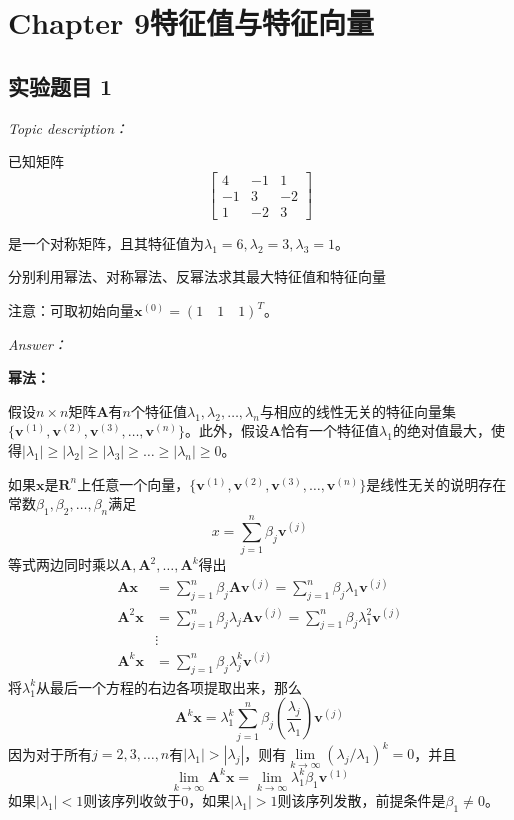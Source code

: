 \documentclass[12pt]{ctexart}
\begin{document}
\newpage
	\section{Chapter 9\quad 特征值与特征向量}
	\label{sec:9}
	
	\subsection{实验题目 1}
	\textit{Topic description：}
	
	已知矩阵
	\[
	\begin{bmatrix}
	4&-1&1 \\
	-1&3&-2 \\
	1&-2&3
	\end{bmatrix}
	\]
	
	是一个对称矩阵，且其特征值为$\lambda_1=6,\lambda_2=3,\lambda_3=1$。
	
	分别利用幂法、对称幂法、反幂法求其最大特征值和特征向量
	
	注意：可取初始向量$\textbf{x}^{(0)}=(1\quad1\quad1)^T$。
	
	\textit{Answer：}
	
	\textbf{幂法：}
	
	假设$n\times n$矩阵$\mathbf{A}$有$n$个特征值$\lambda_1,\lambda_2,\dots,\lambda_n$与相应的线性无关的特征向量集$\{\mathbf{v}^{(1)},\mathbf{v}^{(2)},\mathbf{v}^{(3)},\dots,\mathbf{v}^{(n)}\}$。此外，假设$\mathbf{A}$恰有一个特征值$\lambda_1$的绝对值最大，使得$|\lambda_1|\geq|\lambda_2|\geq|\lambda_3|\geq\dots\geq|\lambda_n|\geq 0$。
	
	如果$\mathbf{x}$是$\mathbf{R}^n$上任意一个向量，$\{\mathbf{v}^{(1)},\mathbf{v}^{(2)},\mathbf{v}^{(3)},\dots,\mathbf{v}^{(n)}\}$是线性无关的说明存在常数$\beta_1,\beta_2,\dots,\beta_n$满足$$x=\sum_{j=1}^{n}\beta_j\mathbf{v}^{(j)}$$等式两边同时乘以$\mathbf{A},\mathbf{A}^2,\dots,\mathbf{A}^k$得出
	\begin{equation*}
	\begin{split}
	\mathbf{A}\mathbf{x}&=\sum_{j=1}^{n}\beta_j\mathbf{A}\mathbf{v}^{(j)}=\sum_{j=1}^{n}\beta_j\lambda_1\mathbf{v}^{(j)} \\
	\mathbf{A}^2\mathbf{x}&=\sum_{j=1}^{n}\beta_j\lambda_j\mathbf{A}\mathbf{v}^{(j)}=\sum_{j=1}^{n}\beta_j\lambda_1^2\mathbf{v}^{(j)} \\
	&\vdots \\
	\mathbf{A}^k\mathbf{x}&=\sum_{j=1}^{n}\beta_j\lambda_j^k\mathbf{v}^{(j)}
	\end{split}
	\end{equation*}将$\lambda_1^k$从最后一个方程的右边各项提取出来，那么$$\mathbf{A}^k\mathbf{x}=\lambda_1^k\sum_{j=1}^{n}\beta_j\left(\frac{\lambda_j}{\lambda_1}\right)\mathbf{v}^{(j)}$$因为对于所有$j=2,3,\dots,n$有$|\lambda_1|>|\lambda_j|$，则有$\lim\limits_{k\rightarrow\infty}(\lambda_j/\lambda_1)^k=0$，并且$$\lim\limits_{k\rightarrow\infty}\mathbf{A}^k\mathbf{x}=\lim\limits_{k\rightarrow\infty}\lambda_1^k\beta_1\mathbf{v}^{(1)}$$如果$|\lambda_1|<1$则该序列收敛于0，如果$|\lambda_1|>1$则该序列发散，前提条件是$\beta_1\neq 0$。
	
\end{document}
